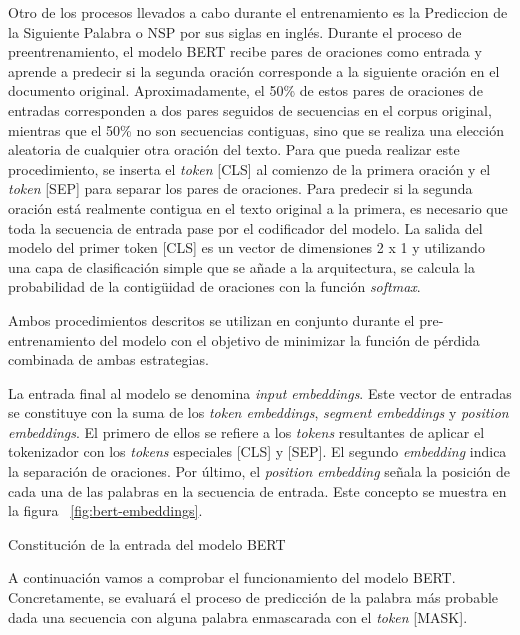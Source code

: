 Otro de los procesos llevados a cabo durante el entrenamiento es la Prediccion de la Siguiente Palabra o NSP por sus siglas en inglés. Durante el proceso de preentrenamiento, el modelo BERT recibe pares de oraciones como entrada y aprende a predecir si la segunda oración corresponde a la siguiente oración en el documento original. Aproximadamente, el 50\% de estos pares de oraciones de entradas corresponden a dos pares seguidos de secuencias en el corpus original, mientras que el 50\% no son secuencias contiguas, sino que se realiza una elección aleatoria de cualquier otra oración del texto. Para que pueda realizar este procedimiento, se inserta el \textit{token} [CLS] al comienzo de la primera oración y el \textit{token} [SEP] para separar los pares de oraciones.
Para predecir si la segunda oración está realmente contigua en el texto original a la primera, es necesario que toda la secuencia de entrada pase por el codificador del modelo. La salida del modelo del primer token [CLS] es un vector de dimensiones 2 x 1 y utilizando una capa de clasificación simple que se añade a la arquitectura, se calcula la probabilidad de la contigüidad de oraciones con la función \textit{softmax}.

Ambos procedimientos descritos se utilizan en conjunto durante el pre-entrenamiento del modelo con el objetivo de minimizar la función de pérdida combinada de ambas estrategias.

La entrada final al modelo se denomina \textit{input embeddings}. Este vector de entradas se constituye con la suma de los \textit{token embeddings}, \textit{segment embeddings} y \textit{position embeddings}. El primero de ellos se refiere a los \textit{tokens} resultantes de aplicar el tokenizador con los \textit{tokens} especiales [CLS] y [SEP]. El segundo \textit{embedding} indica la separación de oraciones. Por último, el \textit{position embedding} señala la posición de cada una de las palabras en la secuencia de entrada. Este concepto se muestra en la figura ~\ref{fig:bert-embeddings}.


%
{Constitución de la entrada del modelo BERT}



A continuación vamos a comprobar el funcionamiento del modelo BERT. Concretamente, se evaluará el proceso de predicción de la palabra más probable dada una secuencia con alguna palabra enmascarada con el \textit{token} [MASK].

